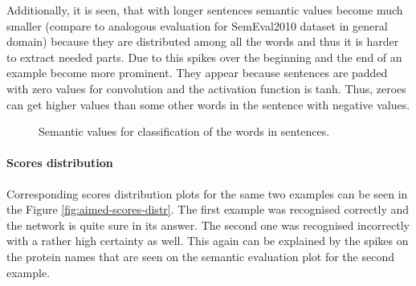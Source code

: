 Additionally, it is seen, that with longer sentences semantic values become much smaller (compare to 
analogous evaluation for SemEval2010 dataset in general domain) because they are distributed 
among all the words and thus it is harder to extract needed parts. Due to this spikes over the beginning and the end of 
an example become more prominent. They appear because sentences are padded with zero values for convolution and the 
activation function is tanh. Thus, zeroes can get higher values than some other words in the sentence with negative 
values.

\begin{figure}[H]
  \tiny
\centering
{}
\caption[Semantic values, medical domain supervised experiments]{ Semantic values for classification of the words in sentences. }
\label{fig:aimed-semantic-val}
\end{figure}

\paragraph{Scores distribution}
Corresponding scores distribution plots for the same two examples can be seen in the Figure 
\ref{fig:aimed-scores-distr}. The first example was recognised correctly and the network is quite 
sure in its answer. The second one was recognised 
incorrectly with a rather high certainty as well. This again can be explained by the spikes on the protein names 
that are seen on the semantic evaluation plot for the second example.

